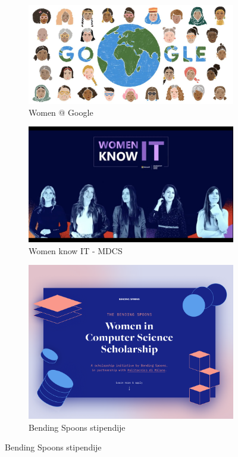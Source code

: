 \documentclass[12pt]{article}
\begin{document}
\begin{figure}[htp]
    \centering
    \begin{subfigure}{.5\textwidth}
        \centering
        \includegraphics[width=0.7\linewidth]{google.png}
        \caption{Women @ Google}
    \end{subfigure}

    \begin{subfigure}{.5\textwidth}
    \centering
    \includegraphics[width=0.7\linewidth]{womenknowit.png}
    \caption{Women know IT - MDCS}
    \end{subfigure}

    \begin{subfigure}{.5\textwidth}
    \centering
    \includegraphics[width=0.7\linewidth]{bendingspoons.png}
    \caption{Bending Spoons stipendije}
    \end{subfigure}
\end{figure}
\end{document}

